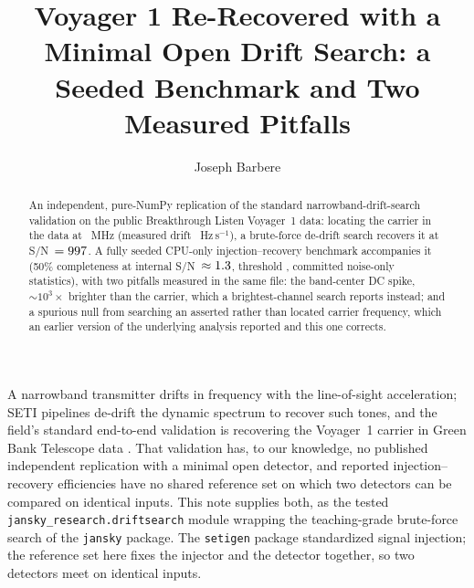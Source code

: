 \documentclass[RNAAS]{aastex631}
\newcommand{\code}[1]{\texttt{#1}}
\begin{document}
\title{Voyager 1 Re-Recovered with a Minimal Open Drift Search: a Seeded Benchmark and Two
Measured Pitfalls}

\author[0009-0008-3289-4447]{Joseph Barbere}

\begin{abstract}
An independent, pure-NumPy replication of the standard narrowband-drift-search validation on
the public Breakthrough Listen Voyager~1 data: locating the carrier in the data at
\dsVoyFreq~MHz (measured drift \dsVoyDriftHz~Hz\,s$^{-1}$), a brute-force de-drift search
recovers it at S/N~$=997$. A fully seeded CPU-only injection--recovery benchmark
accompanies it (50\% completeness at internal S/N~$\approx1.3$, threshold \dsThreshold,
committed noise-only statistics), with two pitfalls measured in the same file: the band-center
DC spike, $\sim10^{3}\times$ brighter than the carrier, which a brightest-channel search
reports instead; and a spurious null from searching an asserted rather than located carrier
frequency, which an earlier version of the underlying analysis reported and this one
corrects.
\end{abstract}

\section{}

A narrowband transmitter drifts in frequency with the line-of-sight acceleration; SETI
pipelines de-drift the dynamic spectrum to recover such tones, and the field's standard
end-to-end validation is recovering the Voyager~1 carrier in Green Bank Telescope data
\citep{enriquez2017,lebofsky2019}. That validation has, to our knowledge, no published
independent replication with a minimal open detector, and reported injection--recovery
efficiencies have no shared reference set on which two detectors can be compared on identical
inputs. This note supplies both, as the tested \code{jansky\_research.driftsearch} module
wrapping the teaching-grade brute-force search of the \code{jansky} package. The
\code{setigen} package \citep{brzycki2022} standardized signal injection; the reference set here
fixes the injector and the detector together, so two detectors meet on identical inputs.
\end{document}
